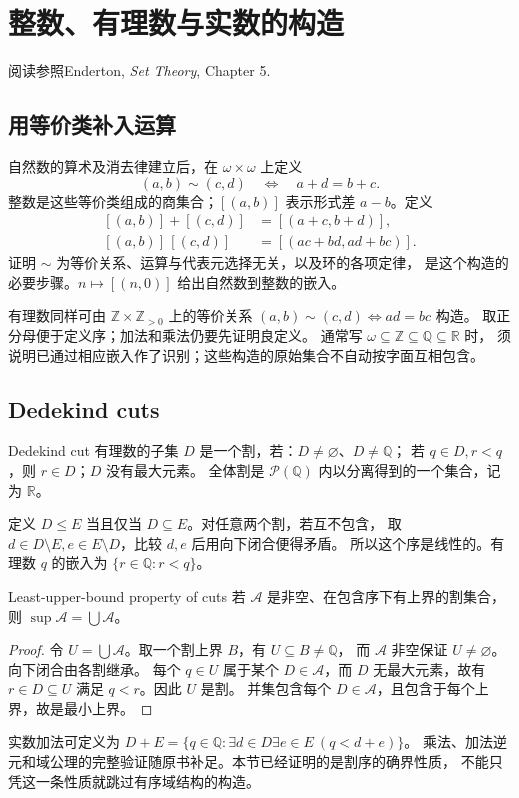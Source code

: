 \chapter{整数、有理数与实数的构造}
\begin{qlnote}{阅读参照}Enderton, \emph{Set Theory}, Chapter 5.\end{qlnote}

\section{用等价类补入运算}
自然数的算术及消去律建立后，在 \(\omega\times\omega\) 上定义
\[
 (a,b)\sim(c,d)\quad\Longleftrightarrow\quad a+d=b+c.
\]
整数是这些等价类组成的商集合；\([(a,b)]\) 表示形式差 \(a-b\)。定义
\[
\begin{aligned}
 [(a,b)]+[(c,d)]&=[(a+c,b+d)],\\
 [(a,b)]\,[(c,d)]&=[(ac+bd,ad+bc)].
\end{aligned}
\]
证明 \(\sim\) 为等价关系、运算与代表元选择无关，以及环的各项定律，
是这个构造的必要步骤。\(n\mapsto[(n,0)]\) 给出自然数到整数的嵌入。

有理数同样可由 \(\mathbb Z\times\mathbb Z_{>0}\) 上的等价关系
\((a,b)\sim(c,d)\Longleftrightarrow ad=bc\) 构造。
取正分母便于定义序；加法和乘法仍要先证明良定义。
通常写 \(\omega\subseteq\mathbb Z\subseteq\mathbb Q\subseteq\mathbb R\) 时，
须说明已通过相应嵌入作了识别；这些构造的原始集合不自动按字面互相包含。

\section{Dedekind cuts}
\begin{definition}{Dedekind cut}
有理数的子集 \(D\) 是一个割，若：\(D\ne\varnothing\)、\(D\ne\mathbb Q\)；
若 \(q\in D,r<q\)，则 \(r\in D\)；\(D\) 没有最大元素。
全体割是 \(\mathcal P(\mathbb Q)\) 内以分离得到的一个集合，记为 \(\mathbb R\)。
\end{definition}
定义 \(D\le E\) 当且仅当 \(D\subseteq E\)。对任意两个割，若互不包含，
取 \(d\in D\setminus E,e\in E\setminus D\)，比较 \(d,e\) 后用向下闭合便得矛盾。
所以这个序是线性的。有理数 \(q\) 的嵌入为 \(\{r\in\mathbb Q:r<q\}\)。

\begin{theorem}{Least-upper-bound property of cuts}
若 \(\mathcal A\) 是非空、在包含序下有上界的割集合，则
\(\sup\mathcal A=\bigcup\mathcal A\)。
\end{theorem}
\begin{proof}
令 \(U=\bigcup\mathcal A\)。取一个割上界 \(B\)，有 \(U\subseteq B\ne\mathbb Q\)，
而 \(\mathcal A\) 非空保证 \(U\ne\varnothing\)。向下闭合由各割继承。
每个 \(q\in U\) 属于某个 \(D\in\mathcal A\)，而 \(D\) 无最大元素，故有
\(r\in D\subseteq U\) 满足 \(q<r\)。因此 \(U\) 是割。
并集包含每个 \(D\in\mathcal A\)，且包含于每个上界，故是最小上界。
\end{proof}
实数加法可定义为
\(D+E=\{q\in\mathbb Q:\exists d\in D\exists e\in E\ (q<d+e)\}\)。
乘法、加法逆元和域公理的完整验证随原书补足。本节已经证明的是割序的确界性质，
不能只凭这一条性质就跳过有序域结构的构造。
